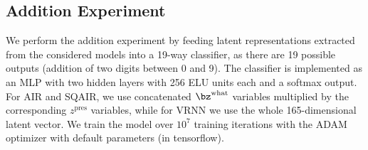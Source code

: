 \subsection{Addition Experiment}

We perform the addition experiment by feeding latent representations extracted from the considered models into a 19-way classifier, as there are 19 possible outputs (addition of two digits between 0 and 9). 
The classifier is implemented as an \gls{MLP} with two hidden layers with 256 \gls{ELU} units each and a softmax output. For \gls{AIR} and \gls{SQAIR}, we use concatenated $\bz^\mathrm{what}$ variables multiplied by the corresponding $z^\mathrm{pres}$ variables, while for \gls{VRNN} we use the whole 165-dimensional latent vector.
We train the model over $10^7$ training iterations with the \gls{ADAM} optimizer \citep{Kingma2015adam} with default parameters (in tensorflow).